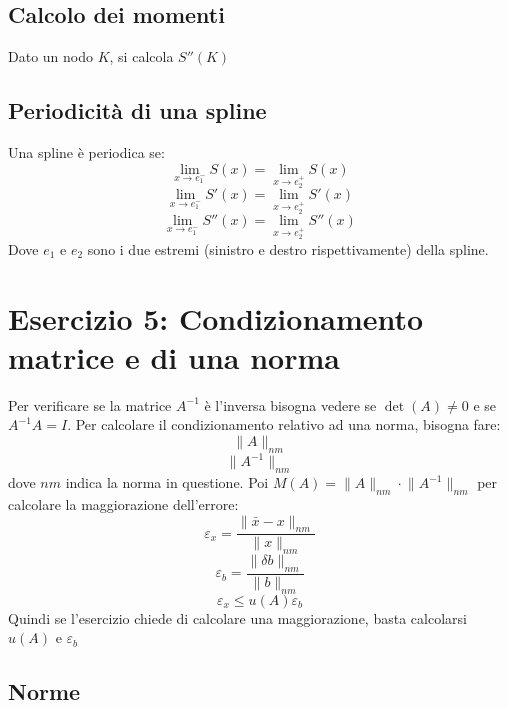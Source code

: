 \documentclass[10pt]{article}
\begin{document}
\subsection{Calcolo dei momenti}
Dato un nodo $K$, si calcola $S''(K)$
\subsection{Periodicità di una spline}
Una spline è periodica se:
\begin{equation*}
    \lim_{x\to e_{1}^{-}}S(x)=\lim_{x\to e_{2}^{+}}S(x)
\end{equation*}
\begin{equation*}
    \lim_{x\to e_{1}^{-}}S'(x)=\lim_{x\to e_{2}^{+}}S'(x)
\end{equation*}
\begin{equation*}
    \lim_{x\to e_{1}^{-}}S''(x)=\lim_{x\to e_{2}^{+}}S''(x)
\end{equation*}
Dove $e_{1}$ e $e_{2}$ sono i due estremi (sinistro e destro rispettivamente) della spline.
\newpage
\section{Esercizio 5: Condizionamento matrice e di una norma}
Per verificare se la matrice $A^{-1}$ è l'inversa bisogna vedere se $\det(A)\neq 0$ e se $A^{-1}A=I$. Per calcolare il condizionamento relativo ad una norma, bisogna fare:
\begin{equation*}
    \lVert A \rVert_{nm}
\end{equation*}
\begin{equation*}
    \lVert A^{-1} \rVert_{nm}
\end{equation*}
dove $nm$ indica la norma in questione. Poi $M(A)=\lVert A \rVert_{nm}\cdot \lVert A^{-1} \rVert_{nm}$ per calcolare la maggiorazione dell'errore:
\begin{equation*}
    \varepsilon_{x}=\frac{\lVert \bar{x} -x \rVert_{nm}}{\lVert x \rVert_{nm}}
\end{equation*}
\begin{equation*}
    \varepsilon_{b}=\frac{\lVert \delta b \rVert_{nm}}{\lVert b \rVert_{nm}}
\end{equation*}
\begin{equation*}
    \varepsilon_{x}\leq u(A)\varepsilon_{b}
\end{equation*}
Quindi se l'esercizio chiede di calcolare una maggiorazione, basta calcolarsi $u(A)$ e $\varepsilon_{b}$
\subsection{Norme}
\end{document}
